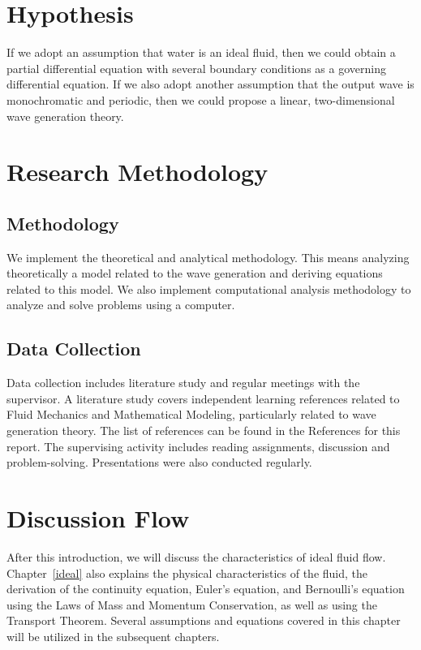 \documentclass[12pt,a4paper]{report}
\begin{document}
\section{Hypothesis}

If we adopt an assumption that water is an ideal fluid, then we could obtain a partial differential equation with several boundary conditions as a governing differential equation. If we also adopt another assumption that the output wave is monochromatic and periodic, then we could propose a linear, two-dimensional wave generation theory.

\section{Research Methodology}

\subsection{Methodology}

We implement the theoretical and analytical methodology. This means analyzing theoretically a model related to the wave generation and deriving equations related to this model. We also implement computational analysis methodology to analyze and solve problems using a computer.

\subsection{Data Collection}

Data collection includes literature study and regular meetings with the supervisor. A literature study covers independent learning references related to Fluid Mechanics and Mathematical Modeling, particularly related to wave generation theory. The list of references can be found in the References for this report. The supervising activity includes reading assignments, discussion and problem-solving. Presentations were also conducted regularly. 

\section{Discussion Flow}

After this introduction, we will discuss the characteristics of ideal fluid flow. Chapter~\ref{ideal} also explains the physical characteristics of the fluid, the derivation of the continuity equation, Euler's equation, and Bernoulli's equation using the Laws of Mass and Momentum Conservation, as well as using the Transport Theorem. Several assumptions and equations covered in this chapter will be utilized in the subsequent chapters.
\end{document}
